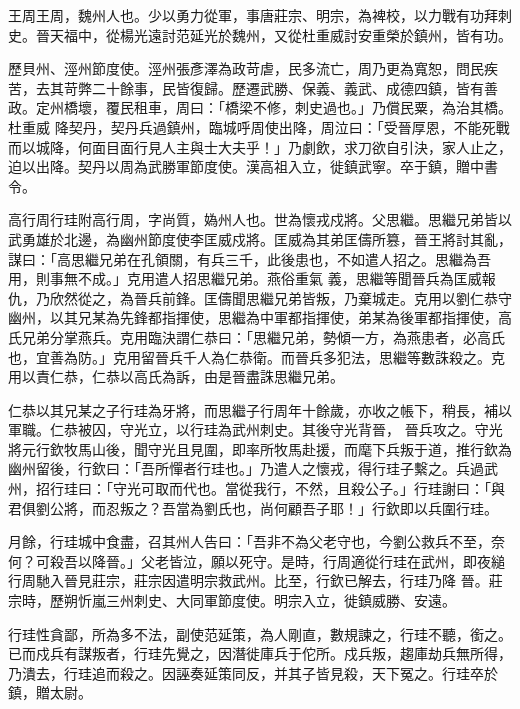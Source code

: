 \begin{pinyinscope}
 王周王周，魏州人也。少以勇力從軍，事唐莊宗、明宗，為裨校，以力戰有功拜刺史。晉天福中，從楊光遠討范延光於魏州，又從杜重威討安重榮於鎮州，皆有功。



 歷貝州、涇州節度使。涇州張彥澤為政苛虐，民多流亡，周乃更為寬恕，問民疾苦，去其苛弊二十餘事，民皆復歸。歷遷武勝、保義、義武、成德四鎮，皆有善政。定州橋壞，覆民租車，周曰：「橋梁不修，刺史過也。」乃償民粟，為治其橋。杜重威
 降契丹，契丹兵過鎮州，臨城呼周使出降，周泣曰：「受晉厚恩，不能死戰而以城降，何面目面行見人主與士大夫乎！」乃劇飲，求刀欲自引決，家人止之，迫以出降。契丹以周為武勝軍節度使。漢高祖入立，徙鎮武寧。卒于鎮，贈中書令。



 高行周行珪附高行周，字尚質，媯州人也。世為懷戎戍將。父思繼。思繼兄弟皆以武勇雄於北邊，為幽州節度使李匡威戍將。匡威為其弟匡儔所篡，晉王將討其亂，謀曰：「高思繼兄弟在孔領關，有兵三千，此後患也，不如遣人招之。思繼為吾用，則事無不成。」克用遣人招思繼兄弟。燕俗重氣
 義，思繼等聞晉兵為匡威報仇，乃欣然從之，為晉兵前鋒。匡儔聞思繼兄弟皆叛，乃棄城走。克用以劉仁恭守幽州，以其兄某為先鋒都指揮使，思繼為中軍都指揮使，弟某為後軍都指揮使，高氏兄弟分掌燕兵。克用臨決謂仁恭曰：「思繼兄弟，勢傾一方，為燕患者，必高氏也，宜善為防。」克用留晉兵千人為仁恭衛。而晉兵多犯法，思繼等數誅殺之。克用以責仁恭，仁恭以高氏為訴，由是晉盡誅思繼兄弟。



 仁恭以其兄某之子行珪為牙將，而思繼子行周年十餘歲，亦收之帳下，稍長，補以軍職。仁恭被囚，守光立，以行珪為武州刺史。其後守光背晉，
 晉兵攻之。守光將元行欽牧馬山後，聞守光且見圍，即率所牧馬赴援，而麾下兵叛于道，推行欽為幽州留後，行欽曰：「吾所憚者行珪也。」乃遣人之懷戎，得行珪子繫之。兵過武州，招行珪曰：「守光可取而代也。當從我行，不然，且殺公子。」行珪謝曰：「與君俱劉公將，而忍叛之？吾當為劉氏也，尚何顧吾子耶！」行欽即以兵圍行珪。



 月餘，行珪城中食盡，召其州人告曰：「吾非不為父老守也，今劉公救兵不至，奈何？可殺吾以降晉。」父老皆泣，願以死守。是時，行周適從行珪在武州，即夜縋行周馳入晉見莊宗，莊宗因遣明宗救武州。比至，行欽已解去，行珪乃降
 晉。莊宗時，歷朔忻嵐三州刺史、大同軍節度使。明宗入立，徙鎮威勝、安遠。



 行珪性貪鄙，所為多不法，副使范延策，為人剛直，數規諫之，行珪不聽，銜之。已而戍兵有謀叛者，行珪先覺之，因潛徙庫兵于佗所。戍兵叛，趨庫劫兵無所得，乃潰去，行珪追而殺之。因誣奏延策同反，并其子皆見殺，天下冤之。行珪卒於鎮，贈太尉。




\end{pinyinscope}

